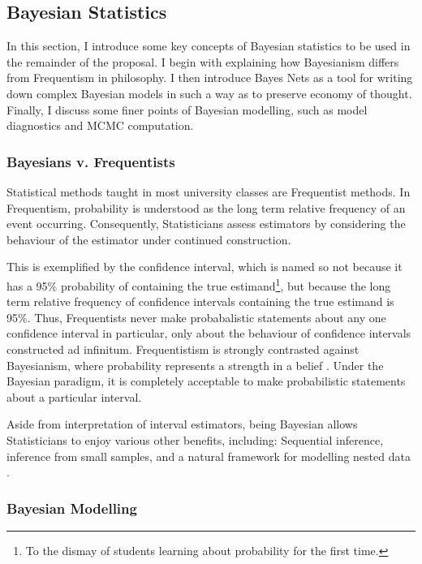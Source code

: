 \subsection{Bayesian Statistics}

In this section, I introduce some key concepts of Bayesian statistics to be used in the remainder of the proposal.  I begin with explaining how Bayesianism differs from Frequentism in philosophy.  I then introduce Bayes Nets as a tool for writing down complex Bayesian models in such a way as to preserve economy of thought.  Finally, I discuss some finer points of Bayesian modelling, such as model diagnostics and MCMC computation.


\subsubsection{Bayesians v. Frequentists}

Statistical methods taught in most  university classes are Frequentist methods.  In Frequentism, probability is understood as the long term relative frequency of an event occurring.  Consequently, Statisticians assess estimators by considering the behaviour of the estimator under continued construction.  

This is exemplified by the confidence interval, which is named so not because it has a 95\% probability of containing the true estimand\footnote{To the dismay of students learning about probability for the first time.}, but because the long term relative frequency of confidence intervals containing the true estimand is 95\%.  Thus, Frequentists never make probabalistic statements about any one confidence interval in particular, only about the behaviour of confidence intervals constructed ad infinitum.  Frequentistism is strongly contrasted against Bayesianism, where probability represents a strength in a belief \cite{gelman2013bayesian}.  Under the Bayesian paradigm, it is completely acceptable to make probabilistic statements about a particular interval.


Aside from interpretation of interval estimators, being Bayesian allows Statisticians to enjoy various other benefits, including: Sequential inference, inference from small samples, and a natural framework for modelling nested data \cite{gelman2013bayesian}.

\subsubsection{Bayesian Modelling}


